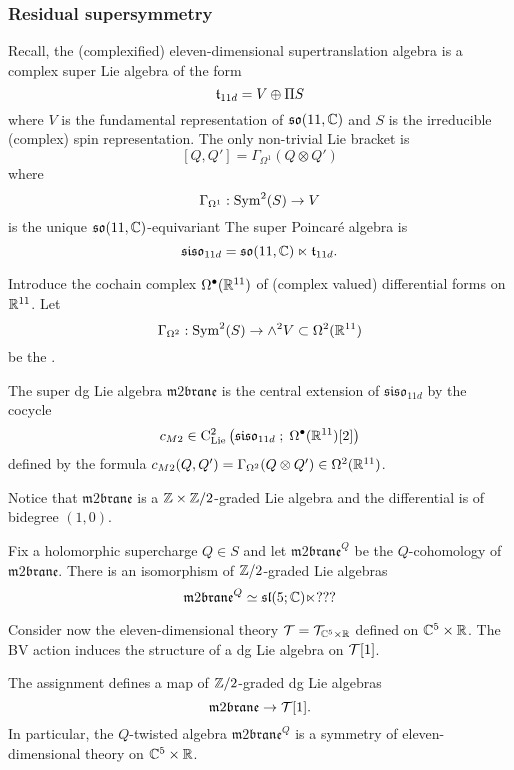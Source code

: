 \documentclass[11pt]{amsart}
\begin{document}
\subsubsection{Residual supersymmetry}

\def\m2{\mathfrak{m}2\mathfrak{brane}}
\def\susy{\mathfrak{susy}}
\def\so{\mathfrak{so}}
\def\siso{\mathfrak{siso}}
\def\fsl{\mathfrak{sl}}

Recall, the (complexified) eleven-dimensional supertranslation algebra is a complex super Lie algebra of the form
\[
  \mathfrak t_{11d} = V \oplus \Pi S
\]
where $V$ is the fundamental representation of $\so(11 , \CC)$ and $S$ is the irreducible (complex) spin representation.
The only non-trivial Lie bracket is
\[
  [Q, Q'] = \Gamma_{\Omega^1}(Q \otimes Q')
\]
where
\[
  \Gamma_{\Omega^1} : \operatorname{Sym}^2(S) \to V 
\]
is the unique $\so(11, \CC)$-equivariant 
The super Poincar\'{e} algebra is
\[
  \siso_{11d} = \so(11 , \CC) \ltimes \ft_{11d} .
\]

Introduce the cochain complex $\Omega^{\bullet}(\mathbb R^{11})$ of (complex valued) differential forms on $\mathbb R^{11}$. 
Let
\[
  \Gamma_{\Omega^2} : \operatorname{Sym}^2(S) \to \wedge^2 V \subset \Omega^2(\mathbb R^{11}) 
\]
be the . 

\begin{dfn}
  The super dg Lie algebra $\m2$ is the central extension of $\siso_{11d}$ by the cocycle
  \[
    c_{M2} \in \clie^2\left(\siso_{11d} \; ; \; \Omega^\bu (\RR^{11})[2]\right)
  \]
  defined by the formula $c_{M2} (Q, Q') = \Gamma_{\Omega^2}(Q \otimes Q') \in \Omega^2(\mathbb R^{11})$.
\end{dfn}

Notice that $\m2$ is a $\mathbb Z \times \mathbb Z/2$-graded Lie algebra and the differential is of bidegree $(1,0)$.

\begin{lem}
  Fix a holomorphic supercharge $Q \in S$ and let $\m2^Q$ be the $Q$-cohomology of $\m2$.
  There is an isomorphism of $\mathbb Z/2$-graded Lie algebras
  \[
    \m2^Q \simeq \fsl(5;\CC) \ltimes ???
  \]
\end{lem}

Consider now the eleven-dimensional theory $\mathcal T = \mathcal T_{\mathbb C^5 \times \mathbb R}$ defined on $\mathbb C^5 \times \mathbb R$. 
The BV action induces the structure of a dg Lie algebra on $\mathcal T[1]$. 

\begin{prop}
The assignment
 defines a map of $\mathbb Z/2$-graded dg Lie algebras 
\[
\m2 \to \cT[1] .
\]
In particular, the $Q$-twisted algebra $\m2^Q$ is a symmetry of eleven-dimensional theory on $\mathbb C^5 \times \mathbb R$. 
\end{prop}
\end{document}
